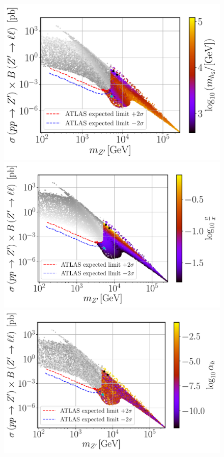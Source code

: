 \documentclass[a4paper,11pt]{article}
\renewcommand{\[}{\left[}
\renewcommand{\]}{\right]}
\begin{document}
\begin{figure}[!htb]
	\centering
	\includegraphics[scale=0.37]{mZp_Xsec_mh2.pdf}
	\includegraphics[scale=0.37]{mZp_Xsec_VEV.pdf}
	\includegraphics[scale=0.37]{mZp_Xsec_alpha.pdf}	

\end{figure}
\end{document}

